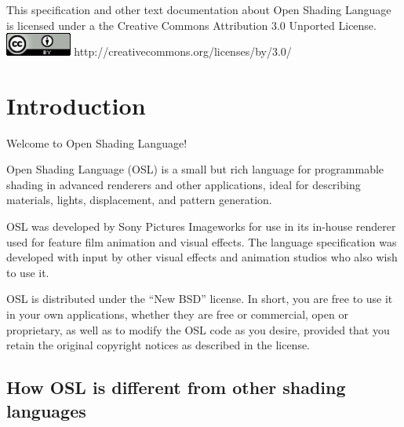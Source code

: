 \documentclass[11pt,letterpaper]{book}
\begin{document}
\vspace{0.5in}

This specification and other text documentation about Open Shading
Language is licensed under a the Creative Commons Attribution 3.0
Unported License. \\

\smallskip
\spc \includegraphics[width=0.85in]{Figures/CC-30BY.png} 
\spc http://creativecommons.org/licenses/by/3.0/
 \bigskip 



\newpage




\setcounter{tocdepth}{1}
\tableofcontents

\mainmatter


%


\chapter{Introduction}
\label{chap:intro}


Welcome to Open Shading Language!

\vspace*{0.2in}

Open Shading Language (OSL) is a small but rich language for
programmable shading in advanced renderers and other applications, ideal
for describing materials, lights, displacement, and pattern generation.

OSL was developed by Sony Pictures Imageworks for use in its in-house
renderer used for feature film animation and visual effects. The
language specification was developed with input by other visual effects
and animation studios who also wish to use it.

OSL is distributed under the ``New BSD'' license.  In short, you are free
to use it in your own applications, whether they are free or commercial,
open or proprietary, as well as to modify the OSL code as you desire,
provided that you retain the original copyright notices as described in
the license.


\section*{How OSL is different from other shading languages}
\end{document}
